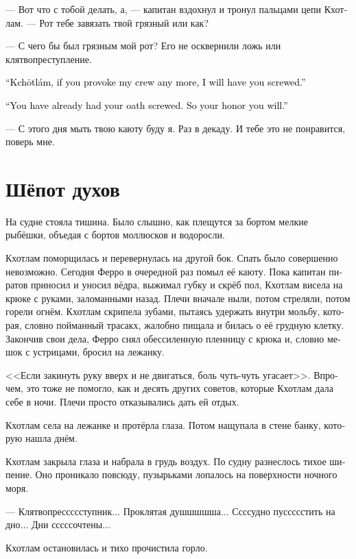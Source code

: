 \documentclass[a4paper,12pt,fleqn]{book}\usepackage{cooltooltips}\usepackage{polyglossia}\setdefaultlanguage{russian}\setotherlanguage{english}\defaultfontfeatures{Ligatures=TeX,Mapping=tex-text} \usepackage{xcolor}\definecolor{lightgray}{HTML}{bbbbbb}\color{lightgray}\newcommand{\ml}[3]{\textenglish{\textcolor{black}{#3}}}
\newcommand{\Kchotlam}{Kch\={o}tl\'{a}m}
\begin{document}
--- Вот что с тобой делать, а, --- капитан вздохнул и тронул пальцами цепи Кхотлам.
--- Рот тебе завязать твой грязный или как?

--- С чего бы был грязным мой рот?
Его не осквернили ложь или клятвопреступление.

\ml{$0$}
{--- Кхотлам, если ты ещё будешь подстрекать мою команду, я пущу тебя по кругу.}
{``\Kchotlam, if you provoke my crew any more, I will have you screwed.''}

\ml{$0$}
{--- Ты уже пустил по кругу свою клятву.}
{``You have already had your oath screwed.}
\ml{$0$}
{Пустишь и свою честь.}
{So your honor you will.''}

--- С этого дня мыть твою каюту буду я.
Раз в декаду.
И тебе это не понравится, поверь мне.

\section{Шёпот духов}

На судне стояла тишина.
Было слышно, как плещутся за бортом мелкие рыбёшки, объедая с бортов моллюсков и водоросли.

Кхотлам поморщилась и перевернулась на другой бок.
Спать было совершенно невозможно.
Сегодня Ферро в очередной раз помыл её каюту.
Пока капитан пиратов приносил и уносил вёдра, выжимал губку и скрёб пол, Кхотлам висела на крюке с руками, заломанными назад.
Плечи вначале ныли, потом стреляли, потом горели огнём.
Кхотлам скрипела зубами, пытаясь удержать внутри мольбу, которая, словно пойманный трасакх, жалобно пищала и билась о её грудную клетку.
Закончив свои дела, Ферро снял обессиленную пленницу с крюка и, словно мешок с устрицами, бросил на лежанку.

<<Если закинуть руку вверх и не двигаться, боль чуть-чуть угасает>>.
Впрочем, это тоже не помогло, как и десять других советов, которые Кхотлам дала себе в ночи.
Плечи просто отказывались дать ей отдых.

Кхотлам села на лежанке и протёрла глаза.
Потом нащупала в стене банку, которую нашла днём.

Кхотлам закрыла глаза и набрала в грудь воздух.
По судну разнеслось тихое шипение.
Оно проникало повсюду, пузырьками лопалось на поверхности ночного моря.

--- Клятвопрессссступник...
Проклятая душшшшша...
Ссссудно пуссссстить на дно...
Дни сссссочтены...

Кхотлам остановилась и тихо прочистила горло.
\end{document}
